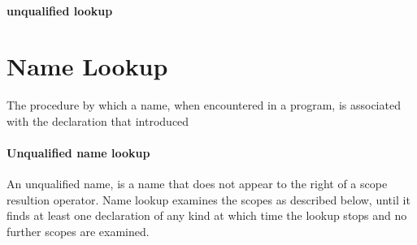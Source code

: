 \documentclass[8pt]{extreport}
\begin{document}
\paragraph{unqualified lookup}

\section{Name Lookup}

The procedure by which a name, when encountered  in a program, is associated with the declaration that introduced


\paragraph{Unqualified name lookup} An unqualified name, is a name that does not appear to the right of a scope resultion operator. Name lookup examines the scopes as described below, until it finds at least one declaration of any kind at which time the lookup stops and no further scopes are examined.\\
\end{document}
